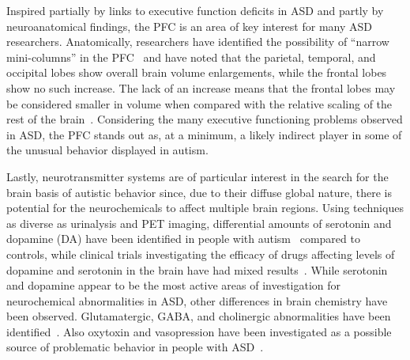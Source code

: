 Inspired partially by links to executive function deficits in ASD and partly by neuroanatomical findings, the PFC is an area of key interest for many ASD researchers. Anatomically, researchers have identified the possibility of ``narrow mini-columns'' in the PFC~\cite{Casanova:2003:AutismMiniColumns} and have noted that the parietal, temporal, and occipital lobes show overall brain volume enlargements, while the frontal lobes show no such increase. The lack of an increase means that the frontal lobes may be considered smaller in volume when compared with the relative scaling of the rest of the brain~\cite{PivenJ:1996:AutismBrainBig}. Considering the many executive functioning problems observed in ASD, the PFC stands out as, at a minimum, a likely indirect player in some of the unusual behavior displayed in autism.

Lastly, neurotransmitter systems are of particular interest in the search for the brain basis of autistic behavior since, due to their diffuse global nature, there is potential for the neurochemicals to affect multiple brain regions. Using techniques as diverse as urinalysis and PET imaging, differential amounts of serotonin and dopamine (DA) have been identified in people with autism~\cite{FernellE:1997:AutismPET,MartineauJ:1992:AutismDopamine,PoseyDJ:2000:AutismDopamine,RefWorks:72} compared to controls, while clinical trials investigating the efficacy of drugs affecting levels of dopamine and serotonin in the brain have had mixed results~\cite{MartineauJ:1992:AutismDopamine,PoseyDJ:2000:AutismDopamine,Chugani:2004:AutismSerotonin}.  While serotonin and dopamine appear to be the most active areas of investigation for neurochemical abnormalities in ASD, other differences in brain chemistry have been observed.  Glutamatergic, GABA, and cholinergic abnormalities have been identified~\cite{RefWorks:95,RefWorks:96,RefWorks:137}.  Also oxytoxin and vasopression have been investigated as a possible source of problematic behavior in people with ASD~\cite{RefWorks:95,RefWorks:75}.



